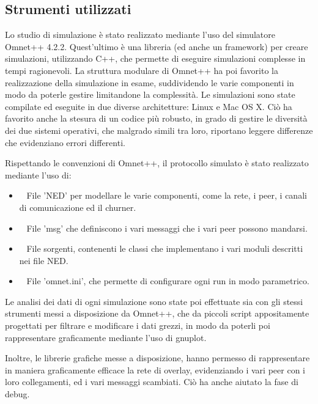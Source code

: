 \documentclass[prodmode,acmtap]{acmlarge}
\begin{document}
\subsection{Strumenti utilizzati}

Lo studio di simulazione è stato realizzato mediante l'uso del simulatore Omnet++ 4.2.2\cite{omnet++}. Quest'ultimo è una libreria (ed anche un framework) per creare simulazioni, utilizzando C++, che permette di eseguire simulazioni complesse in tempi ragionevoli. La struttura modulare di Omnet++ ha poi favorito la realizzazione della simulazione in esame, suddividendo le varie componenti in modo da poterle gestire limitandone la complessità. Le simulazioni sono state compilate ed eseguite in due diverse architetture: Linux e Mac OS X. Ciò ha favorito anche la stesura di un codice più robusto, in grado di gestire le diversità dei due sistemi operativi, che malgrado simili tra loro, riportano leggere differenze che evidenziano errori differenti.

Rispettando le convenzioni di Omnet++, il protocollo simulato è stato realizzato mediante l'uso di:

\begin{itemize}
	\item ~ File 'NED' per modellare le varie componenti, come la rete, i peer, i canali di comunicazione ed il churner.
	\item ~ File 'msg' che definiscono i vari messaggi che i vari peer possono mandarsi.
	\item ~ File sorgenti, contenenti le classi che implementano i vari moduli descritti nei file NED.
	\item ~ File 'omnet.ini', che permette di configurare ogni run in modo parametrico.
\end{itemize}

Le analisi dei dati di ogni simulazione sono state poi effettuate sia con gli stessi strumenti messi a disposizione da Omnet++, che da piccoli script appositamente progettati per filtrare e modificare i dati grezzi, in modo da poterli poi rappresentare graficamente mediante l'uso di gnuplot.

Inoltre, le librerie grafiche messe a disposizione, hanno permesso di rappresentare in maniera graficamente efficace la rete di overlay, evidenziando i vari peer con i loro collegamenti, ed i vari messaggi scambiati. Ciò ha anche aiutato la fase di debug.
\end{document}
